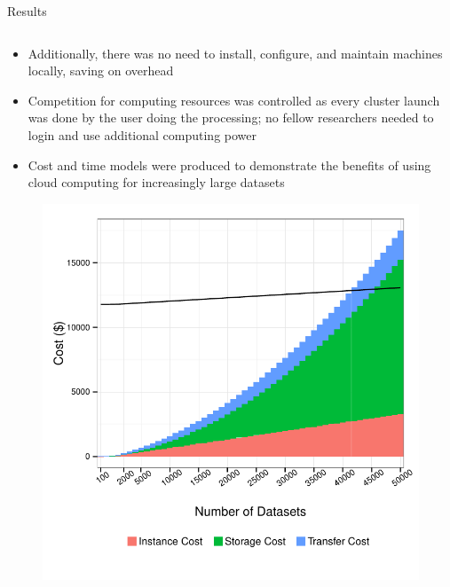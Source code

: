 \documentclass[final,hyperref={pdfpagelabels=false}]{beamer}
\begin{document}
\begin{frame}
\begin{columns}
\begin{column}{.5\textwidth}
{\begin{block}{Results}
\begin{column}{.47\textwidth}
\begin{itemize}
                  \item Additionally, there was no need to install, configure, and maintain machines locally, saving on overhead
                  \item Competition for computing resources was controlled as every cluster launch was done by the user doing the processing; no fellow researchers needed to login and use additional computing power
                  \item Cost and time models were produced to demonstrate the benefits of using cloud computing for increasingly large datasets
              \end{itemize}
              \begin{figure}
                  \includegraphics[width=.99\textwidth]{cpac-costs.pdf}

\end{figure}
\end{column}
\end{block}}
\end{column}
\end{columns}
\end{frame}
\end{document}

